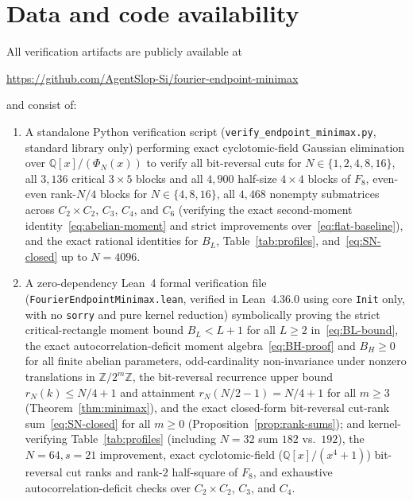 \documentclass[11pt,reqno]{amsart}
\numberwithin{equation}{section}
\theoremstyle{definition}
\theoremstyle{remark}
\newcommand{\Q}{\mathbb{Q}}
\newcommand{\Z}{\mathbb{Z}}
\begin{document}
\section*{Data and code availability}
All verification artifacts are publicly available at
\begin{center}
\url{https://github.com/AgentSlop-Si/fourier-endpoint-minimax}
\end{center}
and consist of:
\begin{enumerate}[label=(\arabic*),leftmargin=2em]
\item A standalone Python verification script (\texttt{verify\_endpoint\_minimax.py}, standard library only) performing exact cyclotomic-field Gaussian elimination over $\Q[x]/(\Phi_N(x))$ to verify all bit-reversal cuts for $N\in\{1,2,4,8,16\}$, all $3{,}136$ critical $3\times 5$ blocks and all $4{,}900$ half-size $4\times 4$ blocks of $F_8$, even-even rank-$N/4$ blocks for $N\in\{4,8,16\}$, all $4{,}468$ nonempty submatrices across $C_2\times C_2$, $C_3$, $C_4$, and $C_6$ (verifying the exact second-moment identity~\eqref{eq:abelian-moment} and strict improvements over~\eqref{eq:flat-baseline}), and the exact rational identities for $B_L$, Table~\ref{tab:profiles}, and~\eqref{eq:SN-closed} up to $N=4096$.
\item A zero-dependency Lean~4 formal verification file (\texttt{FourierEndpointMinimax.lean}, verified in Lean~4.36.0 using core \texttt{Init} only, with no \texttt{sorry} and pure kernel reduction) symbolically proving the strict critical-rectangle moment bound $B_L < L+1$ for all $L\ge 2$ in~\eqref{eq:BL-bound}, the exact autocorrelation-deficit moment algebra~\eqref{eq:BH-proof} and $B_H\ge 0$ for all finite abelian parameters, odd-cardinality non-invariance under nonzero translations in $\Z/2^m\Z$, the bit-reversal recurrence upper bound $r_N(k)\le N/4+1$ and attainment $r_N(N/2-1)=N/4+1$ for all $m\ge 3$ (Theorem~\ref{thm:minimax}), and the exact closed-form bit-reversal cut-rank sum~\eqref{eq:SN-closed} for all $m\ge 0$ (Proposition~\ref{prop:rank-sums}); and kernel-verifying Table~\ref{tab:profiles} (including $N=32$ sum $182$ vs.\ $192$), the $N=64, s=21$ improvement, exact cyclotomic-field ($\Q[x]/(x^4+1)$) bit-reversal cut ranks and rank-$2$ half-square of $F_8$, and exhaustive autocorrelation-deficit checks over $C_2\times C_2$, $C_3$, and $C_4$.
\end{enumerate}



\end{document}
